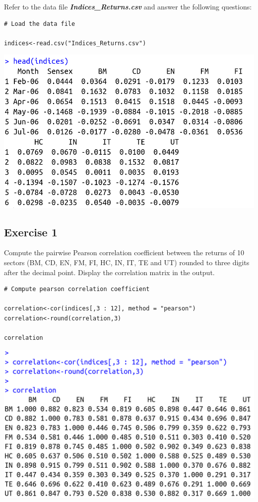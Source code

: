 \documentclass[a4paper,12pt]{article}
\begin{document}
\large 
\noindent Refer to the data file \textbf{\textit{Indices\_Returns.csv}} and answer the following questions:



\begin{framed} \begin{verbatim}
# Load the data file

indices<-read.csv("Indices_Returns.csv")
\end{verbatim}\end{framed} 



\includegraphics[scale=0.45]{00-D1/images/indices_head.png}
\newpage 
\subsection*{Exercise 1}

Compute the pairwise Pearson correlation coefficient between the returns of 10 sectors
(BM, CD, EN, FM, FI, HC, IN, IT, TE and UT) rounded to three digits after the decimal point. 
Display the correlation matrix in the output. 


\begin{framed} \begin{verbatim}
# Compute pearson correlation coefficient 

correlation<-cor(indices[,3 : 12], method = "pearson")
correlation<-round(correlation,3) 

correlation 
\end{verbatim}\end{framed} 

\includegraphics[scale=0.45]{00-D1/images/indices_correlation.png}
\end{document}
